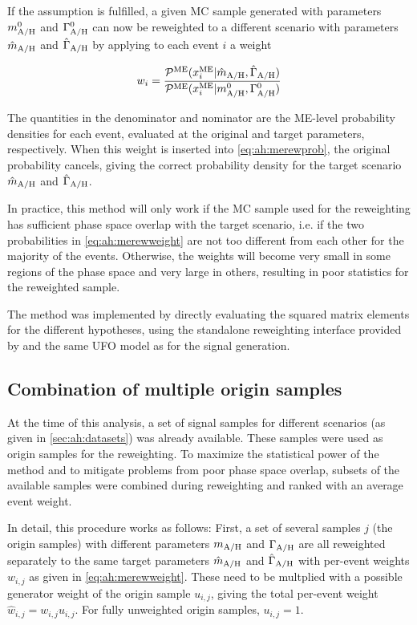 If the assumption is fulfilled, a given \AH MC sample generated with parameters $m_{\mathrm{A/H}}^0$ and $\Gamma_{\mathrm{A/H}}^0$ can now be reweighted to a different \AH scenario with parameters $\hat{m}_{\mathrm{A/H}}$ and $\hat{\Gamma}_{\mathrm{A/H}}$ by applying to each event $i$ a weight 

\begin{equation}
\label{eq:ah:merewweight}
    w_i = \frac{ \mathcal{P}^{\mathrm{ME}} (x_i^{\mathrm{ME}} | \hat{m}_{\mathrm{A/H}} , \hat{\Gamma}_{\mathrm{A/H}} ) } { \mathcal{P}^{\mathrm{ME}} (x_i^{\mathrm{ME}} | m_{\mathrm{A/H}}^0 , \Gamma_{\mathrm{A/H}}^0 ) }
\end{equation}

The quantities in the denominator and nominator are the ME-level probability densities for each event, evaluated at the original and target \AH parameters, respectively. When this weight is inserted into \cref{eq:ah:merewprob}, the original probability cancels, giving the correct probability density for the target scenario $\hat{m}_{\mathrm{A/H}}$ and $\hat{\Gamma}_{\mathrm{A/H}}$.

In practice, this method will only work if the MC sample used for the reweighting has sufficient phase space overlap with the target \AH scenario, i.e. if the two probabilities in \cref{eq:ah:merewweight} are not too different from each other for the majority of the events. Otherwise, the weights will become very small in some regions of the phase space and very large in others, resulting in poor statistics for the reweighted sample.

The method was implemented by directly evaluating the squared matrix elements for the different \AH hypotheses, using the standalone reweighting interface provided by \amcatnlo and the same UFO model as for the signal generation. 

\subsection{Combination of multiple origin samples}

At the time of this analysis, a set of signal samples for different \AH scenarios (as given in \cref{sec:ah:datasets}) was already available. These samples were used as origin samples for the reweighting. To maximize the statistical power of the method and to mitigate problems from poor phase space overlap, subsets of the available samples were combined during reweighting and ranked with an average event weight.

In detail, this procedure works as follows: First, a set of several samples $j$ (the origin samples) with different parameters $m_{\mathrm{A/H}}$ and $\Gamma_{\mathrm{A/H}}$ are all reweighted separately to the same target parameters $\hat{m}_{\mathrm{A/H}}$ and $\hat{\Gamma}_{\mathrm{A/H}}$ with per-event weights $w_{i,j}$ as given in \cref{eq:ah:merewweight}. These need to be multplied with a possible generator weight of the origin sample $u_{i,j}$, giving the total per-event weight $\hat{w}_{i,j} = w_{i,j} u_{i,j}$. For fully unweighted origin samples, $u_{i,j} = 1$. 

